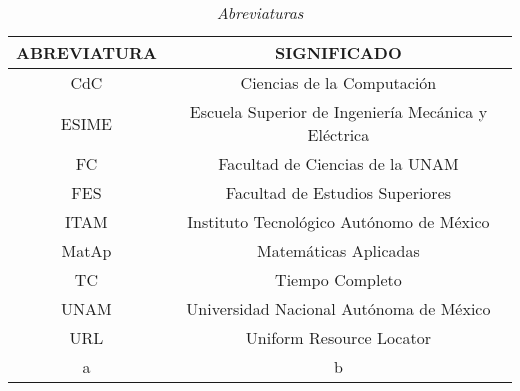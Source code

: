 \begin{appendices}
\begin{table}[H]
\centering
\begin{tabular}{|c|c|}
\hline 
 ABREVIATURA & SIGNIFICADO \\ 
\hline 
 CdC & Ciencias de la Computación \\ 
\hline 
 ESIME & Escuela Superior de Ingeniería Mecánica y Eléctrica\\ 
\hline 
 FC & Facultad de Ciencias de la UNAM \\ 
\hline 
 FES & Facultad de Estudios Superiores \\
\hline 
 ITAM & Instituto Tecnológico Autónomo de México \\ 
\hline 
 MatAp & Matemáticas Aplicadas \\ 
\hline 
 TC & Tiempo Completo \\ 
\hline 
 UNAM & Universidad Nacional Autónoma de México \\ 
\hline 
 URL & Uniform Resource Locator \\ 
\hline 
 a & b \\ 
\hline 
\end{tabular} 
\caption{\textit{Abreviaturas}}
\end{table}
\end{appendices}





